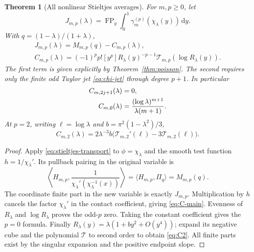\documentclass[11pt]{article}
\newtheorem{theorem}{Theorem}[section]
\theoremstyle{definition}\newtheorem{definition}[theorem]{Definition}
\theoremstyle{remark}\newtheorem{remark}[theorem]{Remark}
\DeclareMathOperator{\FP}{FP}
\newcommand{\dd}{\,\mathrm d}
\newcommand{\Tc}{\mathcal T}
\begin{document}
\begin{theorem}[All nonlinear Stieltjes averages]\label{thm:circle}
For $m,p\ge0$, let
\begin{equation}\label{eq:J-def}
J_{m,p}(\lambda)=\FP_y\int_0^1\gamma_m^{(p)}(\chi_\lambda(y))\dd y.
\end{equation}
With $q=(1-\lambda)/(1+\lambda)$,
\begin{align}\label{eq:J-main}
\boxed{J_{m,p}(\lambda)=M_{m,p}(q)-C_{m,p}(\lambda),}\\
C_{m,p}(\lambda)
=(-1)^pp![y^p]R_\lambda(y)^{-p-1}
\Tc_{m,p}(\log R_\lambda(y)).\label{eq:C-main}
\end{align}
The first term is given explicitly by Theorem~\ref{thm:poisson}. The second requires only the finite odd Taylor jet \eqref{eq:chi-jet} through degree $p+1$. In particular
\begin{align}\label{eq:C-parity}
C_{m,2j+1}(\lambda)&=0,\\
C_{m,0}(\lambda)&=\frac{(\log\lambda)^{m+1}}{\lambda(m+1)}.\notag
\end{align}
At $p=2$, writing $\ell=\log\lambda$ and $b=\pi^2(1-\lambda^2)/3$,
\begin{equation}\label{eq:C2}
C_{m,2}(\lambda)=2\lambda^{-3}b
\bigl(\Tc_{m,2}'(\ell)-3\Tc_{m,2}(\ell)\bigr).
\end{equation}
\end{theorem}
\begin{proof}
Apply \eqref{eq:stieltjes-transport} to $\phi=\chi_\lambda$ and the smooth test function $h=1/\chi_\lambda'$. Its pullback pairing in the original variable is
\[
\left\langle H_{m,p},\frac1{\chi_\lambda'(\chi_\lambda^{-1}(x))}\right\rangle
=\langle H_{m,p},\Pi_q\rangle=M_{m,p}(q).
\]
The coordinate finite part in the new variable is exactly $J_{m,p}$. Multiplication by $h$ cancels the factor $\chi_\lambda'$ in the contact coefficient, giving \eqref{eq:C-main}. Evenness of $R_\lambda$ and $\log R_\lambda$ proves the odd-$p$ zero. Taking the constant coefficient gives the $p=0$ formula. Finally
$R_\lambda(y)=\lambda(1+by^2+O(y^4))$;
expand its negative cube and the polynomial $\Tc$ to second order to obtain \eqref{eq:C2}. All finite parts exist by the singular expansion and the positive endpoint slope.
\end{proof}
\end{document}

